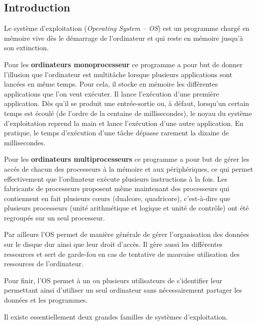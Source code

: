 \documentclass[11pt,oneside]{article}
\begin{document}
\subsection{Introduction}

Le système d'exploitation (\textit{Operating System -- OS}) est un programme chargé en mémoire vive dès le démarrage de l'ordinateur et qui reste en mémoire jusqu'à son extinction. 

Pour les \textbf{ordinateurs monoprocesseur} ce programme a pour but de donner l’illusion que l’ordinateur est multitâche lorsque plusieurs applications sont lancées en même temps. Pour cela, il stocke en mémoire les différentes applications que l’on veut exécuter. Il lance l’exécution d’une première application. Dès qu’il se produit une entrée-sortie ou, à défaut, lorsqu’un certain temps est écoulé (de l’ordre de la centaine de millisecondes), le noyau du système d’exploitation reprend la main et lance l’exécution d’une autre application. En pratique, le temps d’exécution d’une tâche dépasse rarement la dizaine de millisecondes.

Pour les \textbf{ordinateurs multiprocesseurs} ce programme a pour but de gérer les accés de chacun des processeurs à la mémoire et aux périphériques, ce qui permet
effectivement que l’ordinateur exécute plusieurs instructions à la fois. Les fabricants
de processeurs proposent même maintenant des processeurs qui contiennent en fait plusieurs
c\oe{}urs (dualcore, quadricore), c’est-à-dire que plusieurs processeurs (unité arithmétique
et logique et unité de contrôle) ont été regroupés sur un seul processeur.

Par ailleurs l'OS permet de manière générale de gérer l'organisation des données sur le disque dur ainsi que leur droit d'accès. Il gère aussi les différentes ressources et sert de garde-fou en cas de tentative de mauvaise utilisation des ressources de l'ordinateur.

Pour finir, l'OS permet à un ou plusieurs utilisateurs de s'identifier leur permettant ainsi d'utiliser un seul ordinateur sans nécessairement partager les données et les programmes. 


Il existe essentiellement deux grandes familles de systèmes d’exploitation. 
\end{document}
